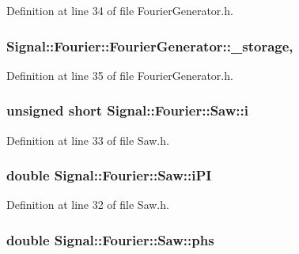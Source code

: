 Definition at line 34 of file Fourier\+Generator.\+h.

\hypertarget{classSignal_1_1Fourier_1_1FourierGenerator_ab6e6b79cf56e31c9a1b5766f357f8cfb}{
\subsubsection[{\+\_\+storage}]{ Signal\+::\+Fourier\+::\+Fourier\+Generator\+::\+\_\+storage\hspace{0.3cm}{\ttfamily [protected]}, {\ttfamily [inherited]}}}\label{classSignal_1_1Fourier_1_1FourierGenerator_ab6e6b79cf56e31c9a1b5766f357f8cfb}


Definition at line 35 of file Fourier\+Generator.\+h.

\hypertarget{classSignal_1_1Fourier_1_1Saw_a1e575a999b316e51cb3a4f8af962749c}{
\subsubsection[{i}]{\setlength{\rightskip}{0pt plus 5cm}unsigned short Signal\+::\+Fourier\+::\+Saw\+::i\hspace{0.3cm}{\ttfamily [protected]}}}\label{classSignal_1_1Fourier_1_1Saw_a1e575a999b316e51cb3a4f8af962749c}


Definition at line 33 of file Saw.\+h.

\hypertarget{classSignal_1_1Fourier_1_1Saw_a70dccb676ad58a1b6ef4b053081bec3f}{
\subsubsection[{i\+P\+I}]{\setlength{\rightskip}{0pt plus 5cm}double Signal\+::\+Fourier\+::\+Saw\+::i\+P\+I\hspace{0.3cm}{\ttfamily [protected]}}}\label{classSignal_1_1Fourier_1_1Saw_a70dccb676ad58a1b6ef4b053081bec3f}


Definition at line 32 of file Saw.\+h.

\hypertarget{classSignal_1_1Fourier_1_1Saw_a3c26ea58f2340c1d9a296937cec78a86}{
\subsubsection[{phs}]{\setlength{\rightskip}{0pt plus 5cm}double Signal\+::\+Fourier\+::\+Saw\+::phs\hspace{0.3cm}{\ttfamily [protected]}}}\label{classSignal_1_1Fourier_1_1Saw_a3c26ea58f2340c1d9a296937cec78a86}


